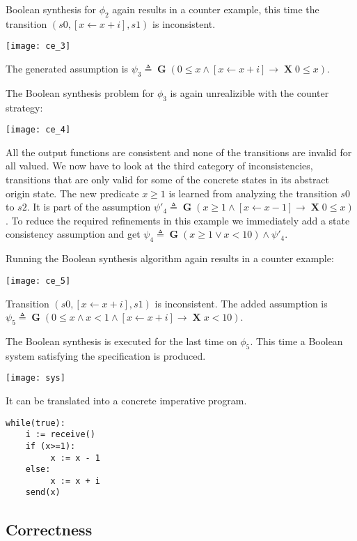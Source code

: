 \documentclass[runningheads]{llncs}
\newcommand{\globally}{\operatorname{\mathbf{G}}}
\newcommand{\lnext}{\operatorname{\mathbf{X}}}
\begin{document}
Boolean synthesis for $\phi_2$ again results in a counter example, this time the transition $(s0,[x \leftarrow x+i],s1)$ is inconsistent.

\texttt{[image: ce\_3]}

The generated assumption is $\psi_3 \triangleq \globally (0 \leq x  \land [x \leftarrow x+i] \rightarrow \lnext 0 \leq x )$.

The Boolean synthesis problem for $\phi_3$ is again unrealizible with the counter strategy:

\texttt{[image: ce\_4]}

All the output functions are consistent and none of the transitions are invalid for all valued.
We now have to look at the third category of inconsistencies, transitions that are only valid for some of the concrete states in its abstract origin state. The new predicate $x\geq1$ is learned from analyzing the transition $s0$ to $s2$.
It is part of the assumption $\psi'_4 \triangleq \globally (x \geq 1 \land [x \leftarrow x-1] \rightarrow \lnext 0 \leq x)$.
To reduce the required refinements in this example we immediately add a state consistency assumption and get $\psi_4 \triangleq \globally (x \geq 1 \lor x < 10) \land \psi'_4$.

Running the Boolean synthesis algorithm again results in a counter example:

\texttt{[image: ce\_5]}

Transition $(s0,[x \leftarrow x+i],s1)$ is inconsistent. The added assumption is 
$\psi_5 \triangleq \globally (0 \leq x \land x < 1 \land [x \leftarrow x+i] \rightarrow \lnext x < 10)$.

The Boolean synthesis is executed for the last time on $\phi_5$.
This time a Boolean system satisfying the specification is produced.

\texttt{[image: sys]}

It can be translated into a concrete imperative program.

\begin{lstlisting}
while(true):
    i := receive()
    if (x>=1):
         x := x - 1
    else:
         x := x + i
    send(x)
\end{lstlisting}


\subsection{Correctness}
\end{document}
